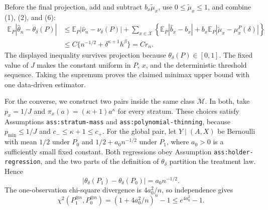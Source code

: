 Before the final projection, add and subtract \(b_x\widetilde\mu_x\), use \(0\leq\widetilde\mu_x\leq1\), and combine (1), (2), and (6):
\[
 \begin{aligned}
 \mathbb E_P|\widehat\theta_n-\theta_\delta(P)|
 &\leq \mathbb E_P|\widehat\nu_n-\nu_\delta(P)|
 +\sum_{x\in\mathcal X}\left\{\mathbb E_P|\widehat b_x-b_x|
 +b_x\mathbb E_P|\widetilde\mu_x-\mu_x^P(\delta)|\right\}\\
 &\leq C\{n^{-1/2}+\delta^{\kappa+1}h^\beta\}=Cr_n. 
 \end{aligned} \tag{7}
\]
The displayed inequality survives projection because \(\theta_\delta(P)\in[0,1]\).  The fixed value of \(J\) makes the constant uniform in \(P\), \(x\), and the deterministic threshold sequence.  Taking the supremum proves the claimed minimax upper bound with one data-driven estimator.

For the converse, we construct two pairs inside the same class \(\mathcal M\).  In both, take \(p_x=1/J\) and \(\pi_x(a)=(\kappa+1)a^\kappa\) for every stratum.  These choices satisfy Assumptions \texttt{ass:stratum-mass} and \texttt{ass:polynomial-thinning}, because \(p_{\min}\leq1/J\) and \(c_-\leq\kappa+1\leq c_+\).  For the global pair, let \(Y\mid(A,X)\) be Bernoulli with mean \(1/2\) under \(P_0\) and \(1/2+a_0n^{-1/2}\) under \(P_1\), where \(a_0>0\) is a sufficiently small fixed constant.  Both regressions obey Assumption \texttt{ass:holder-regression}, and the two parts of the definition of \(\theta_\delta\) partition the treatment law.  Hence
\[
 |\theta_\delta(P_1)-\theta_\delta(P_0)|=a_0n^{-1/2}. \tag{8}
\]
The one-observation chi-square divergence is \(4a_0^2/n\), so independence gives
\[
 \chi^2(P_1^{\otimes n},P_0^{\otimes n})
 =(1+4a_0^2/n)^n-1\leq e^{4a_0^2}-1. \tag{9}
\]

